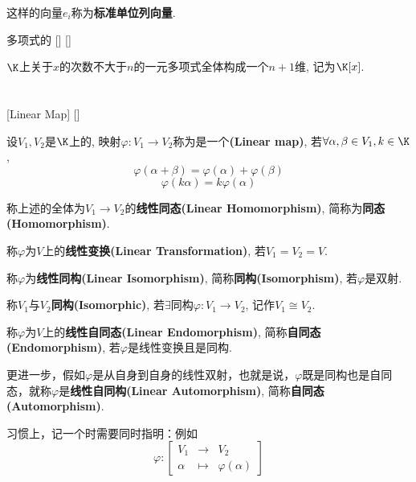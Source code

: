 \documentclass[UTF8]{ctexart}
\begin{document}
\begin{xmp}
			这样的向量$e_i$称为\textbf{标准单位列向量}. 
		\end{xmp}
		
		\begin{xmp}
			[]
			{多项式的}
			[]
			[]

			$\K$上关于$x$的次数不大于$n$的一元多项式全体构成一个$n+1$维, 记为$\K[x]$. 
		\end{xmp}
		
		
		
\section{}

	\subsection{}
		
		\begin{dfn}
			[Linear-Map]
			{}
			[Linear Map]
			[]

			设$V_{1},V_{2}$是$\K$上的, 映射$\varphi: V_{1}\to V_{2}$称为是一个\textbf{(Linear map)}, 若$\forall \alpha, \beta\in V_{1}, k\in \K$, 
			\[\varphi (\alpha+\beta)=\varphi(\alpha)+\varphi(\beta)\]
			\[\varphi(k\alpha)=k\varphi(\alpha)\]

			称上述 的全体为$V_1\to V_2$的\textbf{线性同态(Linear Homomorphism)}, 简称为\textbf{同态(Homomorphism)}.
			
			称$\varphi$为$V$上的\textbf{线性变换(Linear Transformation)}, 若$V_{1}=V_{2}=V$. 
			
			称$\varphi$为\textbf{线性同构(Linear Isomorphism)}, 简称\textbf{同构(Isomorphism)}, 若$\varphi$是双射. 
			
			称$V_1$与$V_2$\textbf{同构(Isomorphic)}, 若$\exists$同构$\varphi:V_1\to V_2$, 记作$V_1\cong V_2$. 
			
			称$\varphi$为$V$上的\textbf{线性自同态(Linear Endomorphism)}, 简称\textbf{自同态(Endomorphism)}, 若$\varphi$是线性变换且是同构. 

			更进一步，假如$\varphi$是从自身到自身的线性双射，也就是说，$\varphi$既是同构也是自同态，就称$\varphi$是\textbf{线性自同构(Linear Automorphism)}, 简称\textbf{自同态(Automorphism)}.
		\end{dfn}

		习惯上，记一个 时需要同时指明：例如
		\[\varphi:\begin{bmatrix}
			V_1&\to&V_2\\
			\alpha&\mapsto&\varphi(\alpha)
		\end{bmatrix}\]
		
\end{document}
